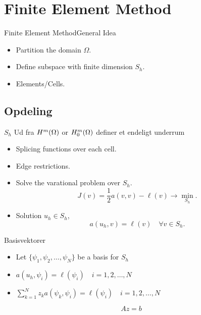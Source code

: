
\section{Finite Element Method}
\begin{frame}{Finite Element Method}{General Idea}
    \begin{itemize}
        \item Partition the domain $\Omega$.
        \item Define subspace with finite dimension $S_h$.
        \item Elements/Cells.
    \end{itemize}
\end{frame}
\subsection{Opdeling}
\begin{frame}{$S_h$}{}
    Ud fra $H^m(\Omega)$ or $H^m_0(\Omega)$ definer et endeligt underrum

    \begin{itemize}
        \item Splicing functions over each cell.
        \item Edge restrictions.
        \item Solve the varational problem over $S_h$.
        \begin{equation}
            J(v) = \frac{1}{2} a(v,v) - \ell(v) \rightarrow \min_{S_h}.
        \end{equation}
        \item Solution $u_h \in S_h$,
        \begin{equation}
            a(u_h,v) = \ell(v) \quad \forall v \in S_h.
        \end{equation}
    \end{itemize}
\end{frame}
\begin{frame}{Basisvektorer}
   \begin{itemize}
    \item Let $ \{ \psi_1, \psi_2, \ldots, \psi_N \}$ be a basis for $S_h$ 
    \item $ a(u_h, \psi_i) = \ell(\psi_i) \quad i = 1, 2, \ldots, N $ 
    \item $\sum_{k=1}^N z_k a(\psi_k,\psi_i) = \ell(\psi_i) \quad i = 1,2,\ldots,N $
   \end{itemize} 
   \begin{equation*}
    Az = b
   \end{equation*}
\end{frame}
